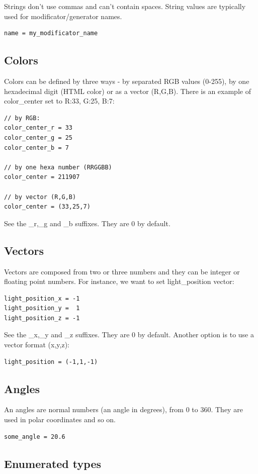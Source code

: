 \documentclass[9pt]{article}
\begin{document}
Strings don't use commas and can't contain spaces. String values are typically 
used for modificator/generator names.
\begin{verbatim}
name = my_modificator_name
\end{verbatim}

\subsection{Colors}
Colors can be defined by three ways - by separated RGB values (0-255),
by one hexadecimal digit (HTML color) or as a vector (R,G,B). There is an example
of color\_center set to R:33, G:25, B:7:
\begin{verbatim}
// by RGB:
color_center_r = 33
color_center_g = 25
color_center_b = 7

// by one hexa number (RRGGBB)
color_center = 211907

// by vector (R,G,B)
color_center = (33,25,7) 
\end{verbatim}
See the \_r,\_g and \_b suffixes. They are 0 by default.

\subsection{Vectors}

Vectors are composed from two or three numbers and they
can be integer or floating point numbers. For instance, we want to 
set light\_position vector:
\begin{verbatim}
light_position_x = -1
light_position_y =  1
light_position_z = -1
\end{verbatim}
See the \_x,\_y and \_z suffixes. They are 0 by default. Another option is
to use a vector format (x,y,z):
\begin{verbatim}
light_position = (-1,1,-1)
\end{verbatim}

\subsection{Angles}

An angles are normal numbers (an angle in degrees), from 0 to 360. 
They are used in polar coordinates and so on.
\begin{verbatim}
some_angle = 20.6
\end{verbatim}

\subsection{Enumerated types}
\end{document}
